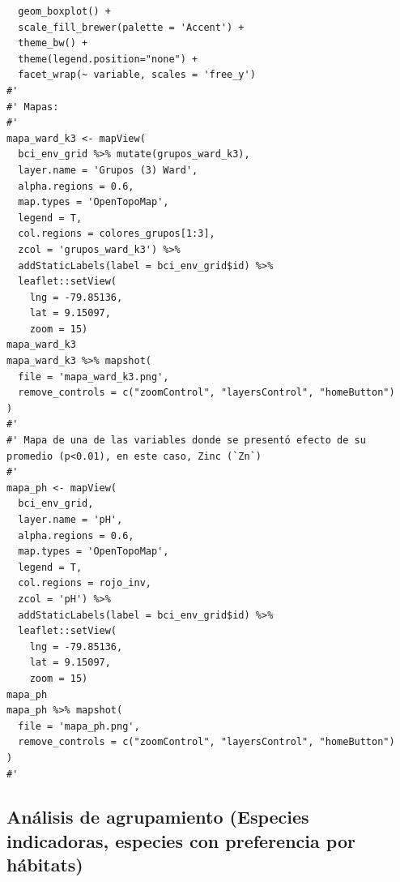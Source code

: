 \documentclass[11pt,]{article}
\begin{document}
\begin{verbatim}
  geom_boxplot() + 
  scale_fill_brewer(palette = 'Accent') +
  theme_bw() +
  theme(legend.position="none") +
  facet_wrap(~ variable, scales = 'free_y')
#' 
#' Mapas:
#' 
mapa_ward_k3 <- mapView(
  bci_env_grid %>% mutate(grupos_ward_k3),
  layer.name = 'Grupos (3) Ward',
  alpha.regions = 0.6,
  map.types = 'OpenTopoMap',
  legend = T,
  col.regions = colores_grupos[1:3],
  zcol = 'grupos_ward_k3') %>%
  addStaticLabels(label = bci_env_grid$id) %>% 
  leaflet::setView(
    lng = -79.85136,
    lat = 9.15097,
    zoom = 15)
mapa_ward_k3
mapa_ward_k3 %>% mapshot(
  file = 'mapa_ward_k3.png', 
  remove_controls = c("zoomControl", "layersControl", "homeButton")
)
#' 
#' Mapa de una de las variables donde se presentó efecto de su promedio (p<0.01), en este caso, Zinc (`Zn`)
#' 
mapa_ph <- mapView(
  bci_env_grid,
  layer.name = 'pH',
  alpha.regions = 0.6,
  map.types = 'OpenTopoMap',
  legend = T,
  col.regions = rojo_inv,
  zcol = 'pH') %>%
  addStaticLabels(label = bci_env_grid$id) %>% 
  leaflet::setView(
    lng = -79.85136,
    lat = 9.15097,
    zoom = 15)
mapa_ph
mapa_ph %>% mapshot(
  file = 'mapa_ph.png', 
  remove_controls = c("zoomControl", "layersControl", "homeButton")
)
#' 
\end{verbatim}

\subsection{Análisis de agrupamiento (Especies indicadoras, especies con
preferencia por
hábitats)}\label{anuxe1lisis-de-agrupamiento-especies-indicadoras-especies-con-preferencia-por-huxe1bitats}
\end{document}
